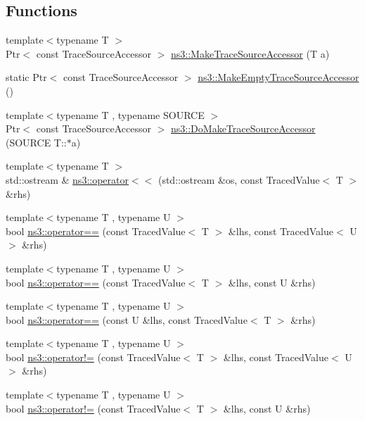 \subsection*{Functions}
\begin{DoxyCompactItemize}
\item 
{\footnotesize template$<$typename T $>$ }\\Ptr$<$ const Trace\+Source\+Accessor $>$ \hyperlink{group__tracing_gab21a770b9855af4e8f69f7531ea4a6b0}{ns3\+::\+Make\+Trace\+Source\+Accessor} (T a)
\item 
static Ptr$<$ const Trace\+Source\+Accessor $>$ \hyperlink{group__tracing_ga6706efc1edcf2de83784aaa7fb8a9609}{ns3\+::\+Make\+Empty\+Trace\+Source\+Accessor} ()
\item 
{\footnotesize template$<$typename T , typename S\+O\+U\+R\+CE $>$ }\\Ptr$<$ const Trace\+Source\+Accessor $>$ \hyperlink{group__tracing_ga58e9c4db480094cef0bb8d87118146e5}{ns3\+::\+Do\+Make\+Trace\+Source\+Accessor} (S\+O\+U\+R\+CE T\+::$\ast$a)
\item 
{\footnotesize template$<$typename T $>$ }\\std\+::ostream \& \hyperlink{group__tracing_gaea0ffe48a5b23b7d6997c9c2aa97316a}{ns3\+::operator$<$$<$} (std\+::ostream \&os, const Traced\+Value$<$ T $>$ \&rhs)
\item 
{\footnotesize template$<$typename T , typename U $>$ }\\bool \hyperlink{group__tracing_ga76eee541dbcb3b4d52efa17a4b83f5bb}{ns3\+::operator==} (const Traced\+Value$<$ T $>$ \&lhs, const Traced\+Value$<$ U $>$ \&rhs)
\item 
{\footnotesize template$<$typename T , typename U $>$ }\\bool \hyperlink{group__tracing_gaa872fc7a29aa663abe83d9b2ee544e68}{ns3\+::operator==} (const Traced\+Value$<$ T $>$ \&lhs, const U \&rhs)
\item 
{\footnotesize template$<$typename T , typename U $>$ }\\bool \hyperlink{group__tracing_gabd559ab613ecee06972fbd65916f38f1}{ns3\+::operator==} (const U \&lhs, const Traced\+Value$<$ T $>$ \&rhs)
\item 
{\footnotesize template$<$typename T , typename U $>$ }\\bool \hyperlink{group__tracing_gabafb92247bf8eefb46bf989cae3e2823}{ns3\+::operator!=} (const Traced\+Value$<$ T $>$ \&lhs, const Traced\+Value$<$ U $>$ \&rhs)
\item 
{\footnotesize template$<$typename T , typename U $>$ }\\bool \hyperlink{group__tracing_gaffa345d32c4a5532362d9b794e1c2d0d}{ns3\+::operator!=} (const Traced\+Value$<$ T $>$ \&lhs, const U \&rhs)

\end{DoxyCompactItemize}
